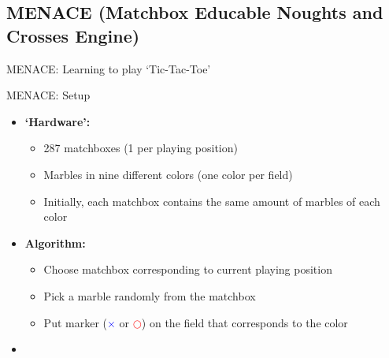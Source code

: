 \subsection{MENACE (Matchbox Educable Noughts and Crosses Engine)}

\begin{frame}{MENACE: Learning to play `Tic-Tac-Toe'}{}
\end{frame}


\begin{frame}{MENACE: Setup}{}
	\begin{itemize}
		\item \textbf{`Hardware':}
		\begin{itemize}
			\item 287 matchboxes (1 per playing position)
			\item Marbles in nine different colors (one color per field)
			\item Initially, each matchbox contains the same amount of marbles of each color
		\end{itemize}
		\item \textbf{Algorithm:}
		\begin{itemize}
			\item Choose matchbox corresponding to current playing position
			\item Pick a marble randomly from the matchbox
			\item Put marker (\textcolor{blue}{$\bm{\times}$} or \textcolor{red}{$\bm{\bigcirc}$})
				on the field that corresponds to the color
		\end{itemize}
		\item {}
	\end{itemize}
\end{frame}


